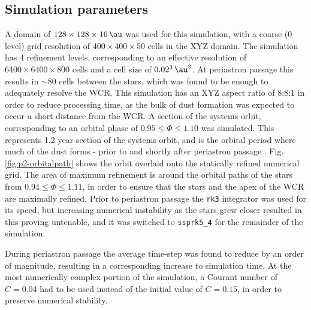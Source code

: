 \subsection{Simulation parameters}
\label{sec:p2-sysparameters}


A domain of $128 \times 128 \times 16 \, \si{\au}$ was used for this simulation, with a coarse (0 level) grid resolution of $400\times 400 \times 50$ cells in the XYZ domain.
The simulation has 4 refinement levels, corresponding to an effective resolution of $6400 \times 6400 \times 800$ cells and a cell size of $0.02^3 \, \si{\au\cubed}$.
At periastron passage this results in $\sim 80$ cells between the stars, which was found to be enough to adequately resolve the WCR. 
This simulation has an XYZ aspect ratio of 8:8:1 in order to reduce processing time, as the bulk of dust formation was expected to occur a short distance from the WCR.
A section of the systems orbit, corresponding to an orbital phase of $0.95 \leq \Phi \leq 1.10$ was simulated.
This represents \num{1.2} year section of the systems orbit, and is the orbital period where much of the dust forms - prior to and shortly after periastron passage \parencite{crowther_dust_2003}.
Fig. \ref{fig:p2-orbitalpath} shows the orbit overlaid onto the statically refined numerical grid.
The area of maximum refinement is around the orbital paths of the stars from $0.94 \leq \Phi \leq 1.11$, in order to ensure that the stars and the apex of the WCR are maximally refined.
Prior to periastron passage the \texttt{rk3} integrator was used for its speed, but increasing numerical instability as the stars grew closer resulted in this proving untenable, and it was switched to \texttt{ssprk5\_4} for the remainder of the simulation.

During periastron passage the average time-step was found to reduce by an order of magnitude, resulting in a corresponding increase to simulation time. %
At the most numerically complex portion of the simulation, a Courant number of $C = 0.04$ had to be used instead of the initial value of $C = 0.15$, in order to preserve numerical stability.

